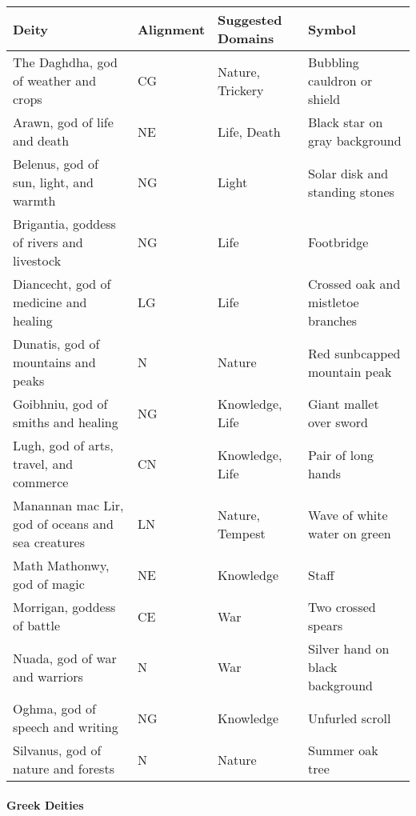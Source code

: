 \documentclass[
]{article}
\begin{document}
\begin{longtable}[]{@{}llll@{}}
\toprule
Deity & Alignment & Suggested Domains & Symbol\tabularnewline
\midrule
\endhead
The Daghdha, god of weather and crops & CG & Nature, Trickery & Bubbling
cauldron or shield\tabularnewline
Arawn, god of life and death & NE & Life, Death & Black star on gray
background\tabularnewline
Belenus, god of sun, light, and warmth & NG & Light & Solar disk and
standing stones\tabularnewline
Brigantia, goddess of rivers and livestock & NG & Life &
Footbridge\tabularnewline
Diancecht, god of medicine and healing & LG & Life & Crossed oak and
mistletoe branches\tabularnewline
Dunatis, god of mountains and peaks & N & Nature & Red sunbcapped
mountain peak\tabularnewline
Goibhniu, god of smiths and healing & NG & Knowledge, Life & Giant
mallet over sword\tabularnewline
Lugh, god of arts, travel, and commerce & CN & Knowledge, Life & Pair of
long hands\tabularnewline
Manannan mac Lir, god of oceans and sea creatures & LN & Nature, Tempest
& Wave of white water on green\tabularnewline
Math Mathonwy, god of magic & NE & Knowledge & Staff\tabularnewline
Morrigan, goddess of battle & CE & War & Two crossed
spears\tabularnewline
Nuada, god of war and warriors & N & War & Silver hand on black
background\tabularnewline
Oghma, god of speech and writing & NG & Knowledge & Unfurled
scroll\tabularnewline
Silvanus, god of nature and forests & N & Nature & Summer oak
tree\tabularnewline
\bottomrule
\end{longtable}

\hypertarget{greek-deities}{%
\paragraph{Greek Deities}\label{greek-deities}}
\end{document}
